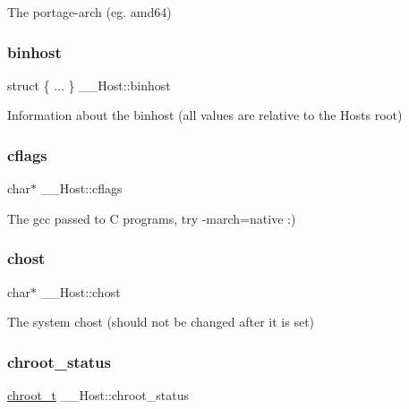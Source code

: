 The portage-\/arch (eg. amd64) 

\mbox{\label{struct_____host_adde139e84a9a3722fee6faab0978568f}} 
\subsubsection{\texorpdfstring{binhost}{binhost}}
{\footnotesize\ttfamily struct \{ ... \}   \+\_\+\+\_\+\+Host\+::binhost}



Information about the binhost (all values are relative to the Host\textquotesingle{}s root) 

\mbox{\label{struct_____host_a94121a0033331d7cdf5425e6d97a74ca}} 
\subsubsection{\texorpdfstring{cflags}{cflags}}
{\footnotesize\ttfamily char$\ast$ \+\_\+\+\_\+\+Host\+::cflags}



The gcc passed to C programs, try -\/march=native \+:) 

\mbox{\label{struct_____host_a73ffa5f9a5dbc9e987f5d804ebc320fa}} 
\subsubsection{\texorpdfstring{chost}{chost}}
{\footnotesize\ttfamily char$\ast$ \+\_\+\+\_\+\+Host\+::chost}



The system chost (should not be changed after it is set) 

\mbox{\label{struct_____host_a6f57f709b8074f8d231036b94806aff7}} 
\subsubsection{\texorpdfstring{chroot\+\_\+status}{chroot\_status}}
{\footnotesize\ttfamily \mbox{\hyperlink{host_8h_a54b3a4fa9f2eb80339d743f0152bc293}{chroot\+\_\+t}} \+\_\+\+\_\+\+Host\+::chroot\+\_\+status}



